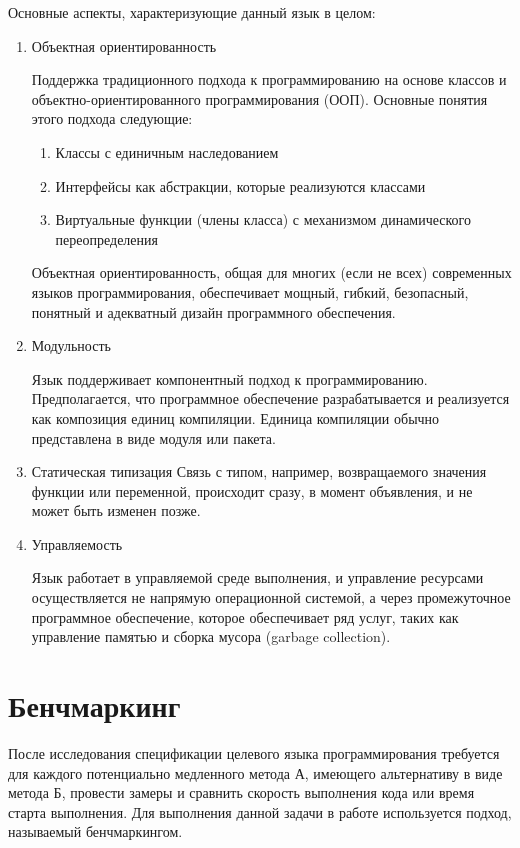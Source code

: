 \documentclass{mipt-thesis-bs}
\begin{document}
Основные аспекты, характеризующие данный язык в целом:

\begin{enumerate}
    \item Объектная ориентированность

    Поддержка традиционного подхода к программированию на основе классов и
    объектно-ориентированного программирования (ООП). Основные понятия этого подхода следующие:
    \begin{enumerate}
        \item Классы с единичным наследованием
        \item Интерфейсы как абстракции, которые реализуются классами
        \item Виртуальные функции (члены класса) с механизмом динамического переопределения
    \end{enumerate}
    Объектная ориентированность, общая для многих (если не всех) современных языков программирования,
    обеспечивает мощный, гибкий, безопасный, понятный и адекватный дизайн программного обеспечения.

    \item Модульность

    Язык поддерживает компонентный подход к программированию. Предполагается, что
    программное обеспечение разрабатывается и реализуется как композиция единиц
     компиляции. Единица компиляции обычно представлена в виде модуля или пакета.

    \item Статическая типизация
    Связь с типом, например, возвращаемого значения функции или переменной, происходит сразу, в момент объявления,
    и не может быть изменен позже.

    \item Управляемость

    Язык работает в управляемой среде выполнения, и управление ресурсами осуществляется не напрямую
    операционной системой, а через промежуточное программное обеспечение, которое обеспечивает ряд услуг,
    таких как управление памятью и сборка мусора (garbage collection).
\end{enumerate}
\section{Бенчмаркинг}

После исследования спецификации целевого языка программирования требуется для каждого
потенциально медленного метода А, имеющего альтернативу в виде метода Б, провести
замеры и сравнить скорость выполнения кода или время старта выполнения. Для выполнения
данной задачи в работе используется подход, называемый бенчмаркингом.
\end{document}
